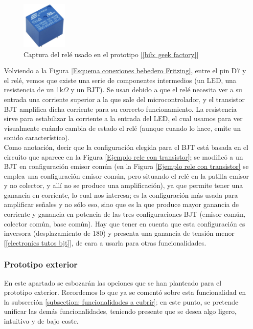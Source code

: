 \documentclass[12pt]{article}
\begin{document}
	\begin{figure}[h]
		\begin{center}
			\includegraphics[width=0.2\textwidth]{img/rele.png}
			\caption{Captura del relé usado en el prototipo [\ref{bib: geek factory}]}
			\label{Captura relé}
		\end{center}
	\end{figure}

	\noindent Volviendo a la Figura \ref{Esquema conexiones bebedero Fritzing}, entre el pin D7 y el relé, vemos que existe una serie de componentes intermedios (un LED, una resistencia de un 1k$\Omega$ y un BJT). Se usan debido a que el relé necesita ver a su entrada una corriente superior a la que sale del microcontrolador, y el transistor BJT amplifica dicha corriente para su correcto funcionamiento. La resistencia sirve para estabilizar la corriente a la entrada del LED, el cual usamos para ver visualmente cuándo cambia de estado el relé (aunque cuando lo hace, emite un sonido característico). \\
	
	\noindent Como anotación, decir que la configuración elegida para el BJT está basada en el circuito que aparece en la Figura \ref{Ejemplo rele con transistor}; se modificó a  un BJT en configuración emisor común  (en la Figura \ref{Ejemplo rele con transistor} se emplea una configuración emisor común, pero situando el relé en la patilla emisor y no colector, y allí no se produce una amplificación), ya que permite tener una ganancia en corriente, lo cual nos interesa; es la configuración más usada para amplificar señales y no sólo eso, sino que es la que produce mayor ganancia de corriente y ganancia en potencia de las tres configuraciones BJT (emisor común, colector común, base común). Hay que tener en cuenta que esta configuración es inversora (desplazamiento de 180\degree) y presenta una ganancia de tensión menor [\ref{electronics tutos bjt}], de cara a usarla para otras funcionalidades.  \\
	
	

	
	\pagebreak
	
	\subsubsection{Prototipo exterior}
	\label{subsubsection: prototipo exterior}
	\noindent En este apartado se esbozarán las opciones que se han planteado para el prototipo exterior. Recordemos lo que ya se comentó sobre esta funcionalidad en la subsección \ref{subsection: funcionalidades a cubrir}; en este punto, se pretende unificar las demás funcionalidades, teniendo presente que se desea algo ligero, intuitivo y de bajo coste. \\
	
\end{document}
